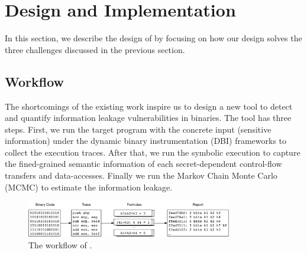 \section{Design and Implementation}
In this section, we describe the design of \tool{} by focusing on
how our design solves the three challenges discussed in the previous
section.

\subsection{Workflow}
The shortcomings of the existing work inspire us to design a new tool to detect
and quantify information leakage vulnerabilities in binaries. The tool has three
steps. First, we run the target program with the concrete input 
(sensitive information) under the dynamic binary instrumentation (DBI) frameworks
to collect the execution traces. After that, we run the symbolic execution 
to capture the fined-grained semantic information of each secret-dependent 
control-flow transfers and data-accesses. 
Finally we run the Markov Chain Monte Carlo (MCMC) to estimate the 
information leakage. 

\begin{figure}[ht]
    \centering
    \includegraphics[width=0.8\textwidth]{./figures/workflow.pdf}
    \caption{The workflow of \tool{}.}
    \label{fig:Test}
\end{figure}

